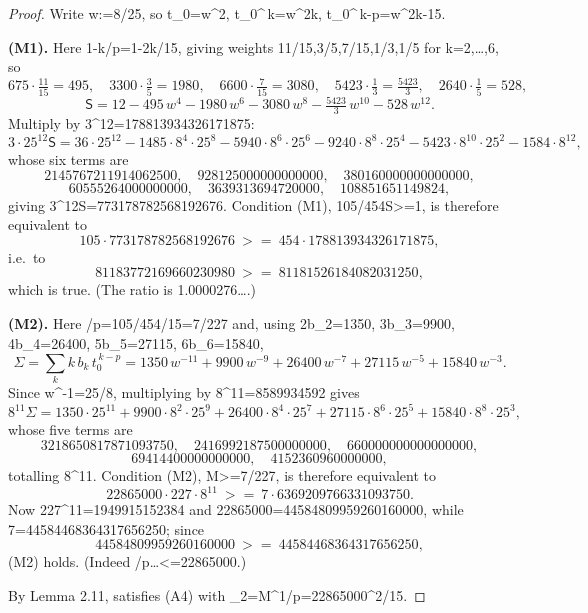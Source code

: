 \documentclass[10pt,reqno]{amsart}
\def\({}\def\){}%
\def\frac#1#2{#1/#2}%
\def\ge{>=}\def\le{<=}%
\theoremstyle{definition}
\theoremstyle{remark}
\begin{document}
\begin{proof}
Write \(w:=\frac8{25}\), so \(t_0=w^2\), \(t_0^{\,k}=w^{2k}\), \(t_0^{\,k-p}=w^{2k-15}\).

\textbf{(M1).} Here \(1-\frac kp=1-\frac{2k}{15}\), giving weights \(\frac{11}{15},\frac35,\frac7{15},\frac13,\frac15\) for \(k=2,\dots,6\), so \[675\cdot\tfrac{11}{15}=495,\quad 3300\cdot\tfrac35=1980,\quad
6600\cdot\tfrac7{15}=3080,\quad 5423\cdot\tfrac13=\tfrac{5423}3,\quad
2640\cdot\tfrac15=528,\] \[\mathsf S=12-495\,w^4-1980\,w^6-3080\,w^8-\tfrac{5423}3\,w^{10}-528\,w^{12}.\] Multiply by \(3^{12}=178813934326171875\): \[3\cdot25^{12}\mathsf S=36\cdot25^{12}-1485\cdot8^{4}\cdot25^{8}-5940\cdot8^{6}\cdot25^{6}
-9240\cdot8^{8}\cdot25^{4}-5423\cdot8^{10}\cdot25^{2}-1584\cdot8^{12},\] whose six terms are \[2145767211914062500,\quad 928125000000000000,\quad 380160000000000000,\] \[60555264000000000,\quad 3639313694720000,\quad 108851651149824,\] giving \(3^{12}\mathsf S=773178782568192676\). Condition (M1), \(\frac{105}{454}\mathsf S\ge1\), is therefore equivalent to \[105\cdot773178782568192676\ \ge\ 454\cdot178813934326171875,\] i.e.~to \[81183772169660230980\ \ge\ 81181526184082031250,\] which is true. (The ratio is \(1.0000276\ldots\).)

\textbf{(M2).} Here \(\frac\lambda p=\frac{105}{454}\cdot\frac2{15}=\frac{7}{227}\) and, using \(2b_2=1350\), \(3b_3=9900\), \(4b_4=26400\), \(5b_5=27115\), \(6b_6=15840\), \[\Sigma=\sum_kk\,b_k\,t_0^{\,k-p}
=1350\,w^{-11}+9900\,w^{-9}+26400\,w^{-7}+27115\,w^{-5}+15840\,w^{-3}.\] Since \(w^{-1}=\frac{25}8\), multiplying by \(8^{11}=8589934592\) gives \[8^{11}\Sigma=1350\cdot25^{11}+9900\cdot8^{2}\cdot25^{9}+26400\cdot8^{4}\cdot25^{7}
+27115\cdot8^{6}\cdot25^{5}+15840\cdot8^{8}\cdot25^{3},\] whose five terms are \[3218650817871093750,\quad 2416992187500000000,\quad 660000000000000000,\] \[69414400000000000,\quad 4152360960000000,\] totalling \(8^{11}\). Condition (M2), \(\mathsf M\ge\frac7{227}\Sigma\), is therefore equivalent to \[22865000\cdot227\cdot8^{11}\ \ge\ 7\cdot6369209766331093750 .\] Now \(227^{11}=1949915152384\) and \(22865000=44584809959260160000\), while \(7=44584468364317656250\); since \[44584809959260160000\ \ge\ 44584468364317656250 ,\] (M2) holds. (Indeed \(\frac\lambda p\ldots\le22865000\).)

By Lemma 2.11, \(\lambda\varphi\) satisfies (A4) with \(\Lambda_2=\mathsf M^{1/p}=22865000^{2/15}\).
\end{proof}
\end{document}
